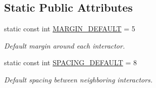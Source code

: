 \subsection*{Static Public Attributes}
\begin{DoxyCompactItemize}
\item 
static const int \mbox{\hyperlink{classGContainer_a9fbdb565727493808a950b2bdfa72145}{M\+A\+R\+G\+I\+N\+\_\+\+D\+E\+F\+A\+U\+LT}} = 5
\begin{DoxyCompactList}\small\item\em Default margin around each interactor. \end{DoxyCompactList}\item 
static const int \mbox{\hyperlink{classGContainer_a2f9f03af35bbe9cd402d12efb4caa4a3}{S\+P\+A\+C\+I\+N\+G\+\_\+\+D\+E\+F\+A\+U\+LT}} = 8
\begin{DoxyCompactList}\small\item\em Default spacing between neighboring interactors. \end{DoxyCompactList}\end{DoxyCompactItemize}
